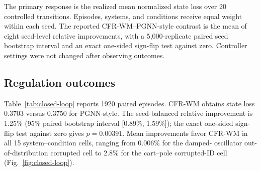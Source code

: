 \documentclass[pdflatex,sn-basic]{sn-jnl}
\newcommand{\method}{CFR-WM}
\newcommand{\ClosedLoopEpisodes}{1920}
\newcommand{\ClosedLoopImprovement}{1.25}
\newcommand{\ClosedLoopCILow}{0.89}
\newcommand{\ClosedLoopCIHigh}{1.59}
\newcommand{\ClosedLoopPValue}{0.00391}
\newcommand{\ClosedLoopCFRLoss}{0.3703}
\newcommand{\ClosedLoopPGNNLoss}{0.3750}
\begin{document}
The primary response is the realized mean normalized state loss over 20
controlled transitions. Episodes, systems, and conditions receive equal weight
within each seed. The reported \method{}--PGNN-style contrast is the mean of
eight seed-level relative improvements, with a 5,000-replicate paired seed
bootstrap interval and an exact one-sided sign-flip test against zero.
Controller settings were not changed after observing outcomes.

\subsection{Regulation outcomes}

Table~\ref{tab:closed-loop} reports \ClosedLoopEpisodes{} paired episodes.
CFR-WM obtains state loss \ClosedLoopCFRLoss{} versus
\ClosedLoopPGNNLoss{} for PGNN-style. The seed-balanced relative improvement
is \ClosedLoopImprovement\% (95\% paired bootstrap interval
[\ClosedLoopCILow\%, \ClosedLoopCIHigh\%]); the exact one-sided sign-flip
test against zero gives $p=\ClosedLoopPValue$. Mean improvements favor CFR-WM
in all 15 system--condition cells, ranging from 0.006\% for the damped-
oscillator out-of-distribution corrupted cell to 2.8\% for the cart--pole
corrupted-ID cell (Fig.~\ref{fig:closed-loop}).

\begin{table}[t]
\centering
\caption{Closed-loop regulation with a common cross-entropy model predictive
controller. State loss and action effort are mean $\pm$ SD across eight
seed-level aggregates. Condition columns report state loss.}
\label{tab:closed-loop}
\end{table}
\end{document}
